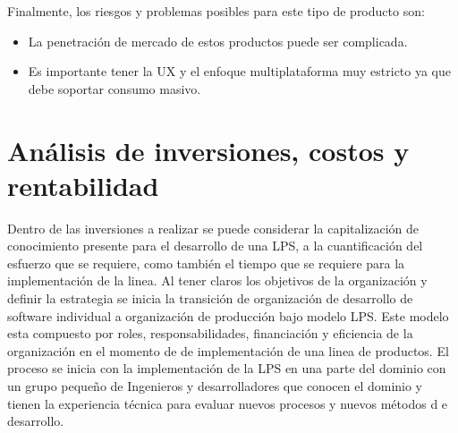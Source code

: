 \documentclass[letterpaper]{article}
\begin{document}
Finalmente, los riesgos y problemas posibles para este tipo de producto son:

\begin{itemize}
    \item La penetración de mercado de estos productos puede ser complicada.
    \item Es importante tener la UX y el enfoque multiplataforma muy estricto ya que debe soportar consumo masivo.
\end{itemize}


\section{\textbf{Análisis de inversiones, costos y rentabilidad}}
Dentro de las inversiones a realizar se puede considerar la capitalización de conocimiento presente para el desarrollo de una LPS, a la cuantificación  del esfuerzo que se requiere, como también el tiempo que se requiere para la implementación de la linea. Al tener claros los objetivos de la organización y definir la estrategia se inicia la  transición de organización de desarrollo de software individual a organización de producción bajo modelo LPS. Este modelo esta compuesto por roles,  responsabilidades, financiación y eficiencia de la organización en el momento de   de implementación de una linea de productos.
El proceso se inicia con la implementación de la LPS en una parte del dominio con un grupo pequeño de Ingenieros y desarrolladores que conocen el dominio y tienen la experiencia técnica para evaluar nuevos procesos y nuevos métodos d e desarrollo.
\end{document}
